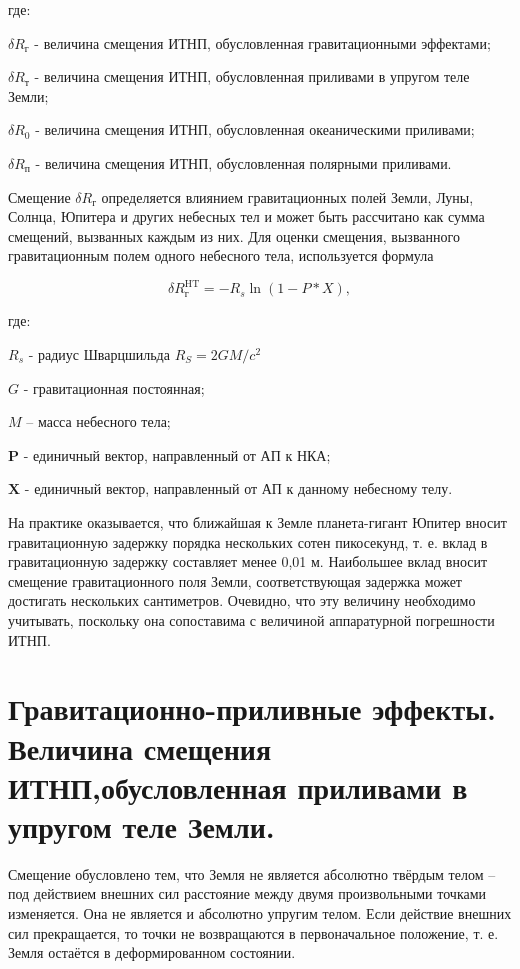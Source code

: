 \documentclass[14pt,a4paper,oneside]{extarticle}
\begin{document}
где:

$\delta R_\text{г}$ - величина смещения ИТНП, обусловленная гравитационными эффектами;

$\delta R_\text{т}$ - величина смещения ИТНП, обусловленная приливами в упругом теле Земли;

$\delta R_\text{0}$ - величина смещения ИТНП, обусловленная океаническими приливами;

$\delta R_\text{п}$ - величина смещения ИТНП, обусловленная полярными приливами.

Смещение $\delta R_\text{г}$ определяется влиянием гравитационных полей Земли, Луны, Солнца, Юпитера и других небесных тел и может быть рассчитано как сумма смещений, вызванных каждым из них. Для оценки смещения, вызванного гравитационным полем одного небесного тела, используется формула

\[\delta R_\text{г}^{\mathrm{HT}}=-R_s\ln(1-P*X),\]

где:

$R_s$ - радиус Шварцшильда $R_S=2GM/{c}^2$

$G$ - гравитационная постоянная;

$M$ – масса небесного тела;

$\boldsymbol{P}$ - единичный вектор, направленный от АП к НКА;

$\boldsymbol{X}$ - единичный вектор, направленный от АП к данному небесному телу.

На практике оказывается, что ближайшая к Земле планета-гигант Юпитер вносит гравитационную задержку порядка нескольких сотен пикосекунд, т. е. вклад в гравитационную задержку составляет менее 0,01 м. Наибольшее вклад вносит смещение гравитационного поля Земли, соответствующая задержка может достигать нескольких сантиметров. Очевидно, что эту величину необходимо учитывать, поскольку она сопоставима с величиной аппаратурной погрешности ИТНП.

\section{Гравитационно-приливные эффекты. Величина смещения ИТНП,обусловленная приливами в упругом теле Земли.}

Смещение обусловлено тем, что Земля не является абсолютно твёрдым телом – под действием внешних сил расстояние между двумя произвольными точками изменяется. Она не является и абсолютно упругим телом. Если действие внешних сил прекращается, то точки не возвращаются в первоначальное положение, т. е. Земля остаётся в деформированном состоянии.
\end{document}
